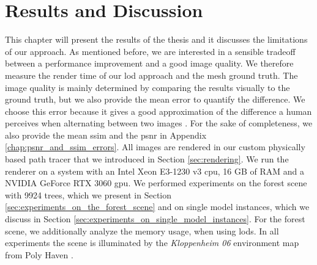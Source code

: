 \chapter{Results and Discussion}
\label{chap:results_and_discussion}
This chapter will present the results of the thesis and it discusses the limitations of our approach.
As mentioned before, we are interested in a sensible tradeoff between a performance improvement and a good image quality.
We therefore measure the render time of our \ac{lod} approach and the mesh ground truth.
The image quality is mainly determined by comparing the results visually to the ground truth, but we also provide the mean \FLIP \cite{flip} error to quantify the difference.
We choose this error because it gives a good approximation of the difference a human perceives when alternating between two images \cite{flip}.
For the sake of completeness, we also provide the mean \ac{ssim} and the \ac{psnr} in Appendix \ref{chap:psnr_and_ssim_errors}.
All images are rendered in our custom physically based path tracer that we introduced in Section \ref{sec:rendering}.
We run the renderer on a system with an Intel Xeon E3-1230 v3 \ac{cpu}, 16 GB of RAM and a NVIDIA GeForce RTX 3060 \ac{gpu}.
We performed experiments on the forest scene with 9924 trees, which we present in Section \ref{sec:experiments_on_the_forest_scene} and on single model instances, which we discuss in Section \ref{sec:experiments_on_single_model_instances}.
For the forest scene, we additionally analyze the memory usage, when using \acsp{lod}.
In all experiments the scene is illuminated by the \textit{Kloppenheim 06} environment map from Poly Haven \cite{envmap}.

